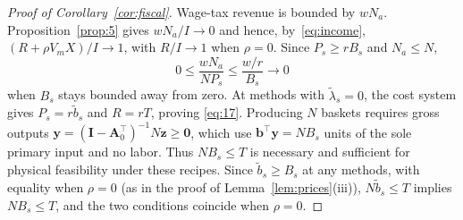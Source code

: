 \documentclass[12pt]{article}
\theoremstyle{plain}
\theoremstyle{definition}
\theoremstyle{remark}
\begin{document}
\begin{proof}[Proof of Corollary~\ref{cor:fiscal}]
Wage-tax revenue is bounded by $wN_a$. Proposition~\ref{prop:5} gives $wN_a/I\to0$ and hence, by~\eqref{eq:income}, $(R+\rho V_mX)/I\to1$, with $R/I\to1$ when $\rho=0$. Since $P_s\ge rB_s$ and $N_a\le N$,
\[
0\le\frac{wN_a}{NP_s}\le\frac{w/r}{B_s}\to0
\]
when $B_s$ stays bounded away from zero. At methods with $\widetilde\lambda_s=0$, the cost system gives $P_s=r\widetilde b_s$ and $R=rT$, proving \eqref{eq:17}. Producing $N$ baskets requires gross outputs $\mathbf{y}=(\mathbf{I}-\mathbf{A}_0^{\top})^{-1}N\mathbf{z}\ge\mathbf{0}$, which use $\mathbf{b}^{\top}\mathbf{y}=NB_s$ units of the sole primary input and no labor. Thus $NB_s\le T$ is necessary and sufficient for physical feasibility under these recipes. Since $\widetilde b_s\ge B_s$ at any methods, with equality when $\rho=0$ (as in the proof of Lemma~\ref{lem:prices}(iii)), $N\widetilde b_s\le T$ implies $NB_s\le T$, and the two conditions coincide when $\rho=0$.
\end{proof}

\end{document}
